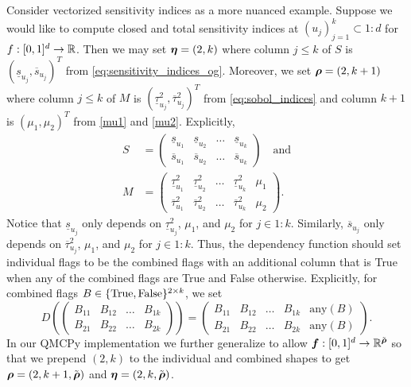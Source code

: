 \documentclass{article}[12pt]
\begin{document}
Consider vectorized sensitivity indices as a more nuanced example. Suppose we would like to compute closed and total sensitivity indices at $(u_j)_{j=1}^k \subset 1:d$ for $f: [0,1]^d \to \mathbb{R}$. Then we may set $\boldsymbol{\eta} = (2,k)$ where column $j \leq k$ of $S$ is $\left(\underline{s}_{u_j},\overline{s}_{u_j}\right)^T$ from \eqref{eq:sensitivity_indices_og}. Moreover, we set $\boldsymbol{\rho} = (2,k+1)$ where column $j \leq k$ of $M$ is $\left(\underline{\tau}_{u_j}^2,\overline{\tau}_{u_j}^2\right)^T$ from \eqref{eq:sobol_indices} and column $k+1$ is $(\mu_1,\mu_2)^T$ from  \eqref{mu1} and \eqref{mu2}. Explicitly,
\begin{align*}
    S &= \begin{pmatrix} 
        \underline{s}_{u_1} & \underline{s}_{u_2} & \dots & \underline{s}_{u_k} \\ 
        \overline{s}_{u_1} & \overline{s}_{u_2} & \dots & \overline{s}_{u_k}
        \end{pmatrix} 
        \quad \text{and} \\ 
    M &=  \begin{pmatrix}
        \underline{\tau}_{u_1}^2 & \underline{\tau}_{u_2}^2 & \dots & \underline{\tau}_{u_k}^2 & \mu_1 \\ 
        \overline{\tau}_{u_1}^2 & \overline{\tau}_{u_2}^2 & \dots & \overline{\tau}_{u_k}^2 & \mu_2
        \end{pmatrix}.
\end{align*}
Notice that $\underline{s}_{u_j}$ only depends on $\underline{\tau}_{u_j}^2$, $\mu_1$, and $\mu_2$ for $j \in 1:k$. Similarly, $\overline{s}_{u_j}$ only depends on $\overline{\tau}_{u_j}^2$, $\mu_1$, and $\mu_2$ for $j \in 1:k$. Thus, the dependency function should set individual flags to be the combined flags with an additional column that is True when any of the combined flags are True and False otherwise. Explicitly, for combined flags $B \in \{\text{True},\text{False}\}^{2 \times k}$, we set 
$$D\left(\begin{pmatrix}B_{11} & B_{12} & \dots & B_{1k} \\ B_{21} & B_{22} & \dots & B_{2k}\end{pmatrix}\right) = \begin{pmatrix}B_{11} & B_{12} & \dots & B_{1k} & \text{any}(B) \\ B_{21} & B_{22} & \dots & B_{2k} & \text{any}(B) \end{pmatrix}.$$
In our QMCPy implementation we further generalize to allow $\boldsymbol{f}:[0,1]^d \to \mathbb{R}^{\tilde{\boldsymbol{\rho}}}$ so that we prepend $(2,k)$ to the individual and combined shapes to get $\boldsymbol{\rho} = (2,k+1,\tilde{\boldsymbol{\rho}})$ and $\boldsymbol{\eta} = (2,k,\tilde{\boldsymbol{\rho}})$.
\end{document}
